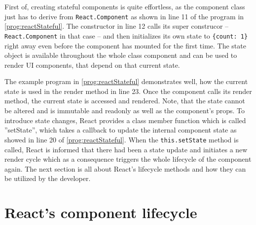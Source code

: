 First of, creating stateful components is quite effortless, as the component class just has to derive from \texttt{React.Component} as shown in line 11 of the program in \ref{prog:reactStateful}. The constructor in line 12 calls its super construcor -- \texttt{React.Component} in that case -- and then initializes its own state to \texttt{\{count: 1\}} right away even before the component has mounted for the first time. The state object is available throughout the whole class component and can be used to render UI components, that depend on that current state.

The example program in \ref{prog:reactStateful} demonstrates well, how the current state is used in the render method in line 23. Once the component calls its render method, the current state is accessed and rendered. Note, that the state cannot be altered and is immutable and readonly as well as the component's props. To introduce state changes, React provides a class member function which is called ''setState'', which takes a callback to update the internal component state as showed in line 20 of \ref{prog:reactStateful}. When the \texttt{this.setState} method is called, React is informed that there had been a state update and initiates a new render cycle which as a consequence triggers the whole lifecycle of the component again. The next section is all about React's lifecycle methods and how they can be utilized by the developer.



\section{React's component lifecycle}

